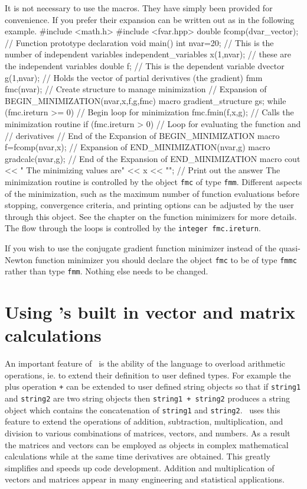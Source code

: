 \documentclass[12pt]{book}
\begin{document}
It is not necessary to use the macros. They have simply
been provided for convenience. If you prefer their expansion
can be written out as in the following example.
\beginexample
#include <math.h>
#include <fvar.hpp>
double fcomp(dvar_vector); // Function prototype declaration
void main()
{
  int nvar=20; // This is the number of independent variables
  independent_variables x(1,nvar); // these are the independent variables
  double f;  // This is the dependent variable
  dvector g(1,nvar);  // Holds the vector of partial derivatives (the gradient) 
  fmm fmc(nvar);      // Create structure to manage minimization
  // Expansion of BEGIN_MINIMIZATION(nvar,x,f,g,fmc) macro 
  gradient_structure gs;
  while (fmc.ireturn >= 0)   // Begin loop for minimization
  {
    fmc.fmin(f,x,g);         // Calls the minimization routine
    if (fmc.ireturn > 0)     // Loop for evaluating the function and
    {                        // derivatives
    // End of the Expansion of BEGIN_MINIMIZATION macro
      f=fcomp(nvar,x);
    // Expansion of END_MINIMIZATION(nvar,g) macro
      gradcalc(nvar,g); 
    }
  }
  // End of the Expansion of END_MINIMIZATION macro
  cout << " The minimizing values are\n" << x << "\n"; // Print out the answer
}
\endexample
The minimization routine is controlled by the object {\tt fmc} 
of type {\tt fmm}. Different aspects of the minimization, such as
the maximum number of function evaluations before stopping, convergence
criteria, and printing options can be adjusted by the user
through this object. See the chapter on the function minimizers for
more details. 
The flow through the loops is controlled by the {\tt integer fmc.ireturn}.

If you wish to use the conjugate gradient function minimizer instead 
of the quasi-Newton function minimizer you should declare the 
object {\tt fmc} to be of type {\tt fmmc} rather than type {\tt fmm}.
Nothing else needs to be changed.

\section{Using \AD's built in vector and matrix calculations}

An important feature of \cplus\ is the ability of the language to
overload arithmetic operations, ie.  to extend their
definition to user defined types. For example the plus operation {\tt +}
can be extended to user defined string objects so that if
{\tt string1} and {\tt string2} are two string objects then
{\tt string1 + string2} produces a string object which contains
the concatenation of {\tt string1} and {\tt string2}. 
 \AD\ uses this feature to extend
the operations of addition, subtraction, multiplication, and division 
to various combinations of matrices, vectors, and numbers.
As a result the matrices and vectors can be employed as
objects in complex mathematical calculations while at the same time
derivatives are obtained. This greatly simplifies and speeds up
code development.
Addition and multiplication of vectors and matrices appear 
in many engineering and statistical applications.
\end{document}
